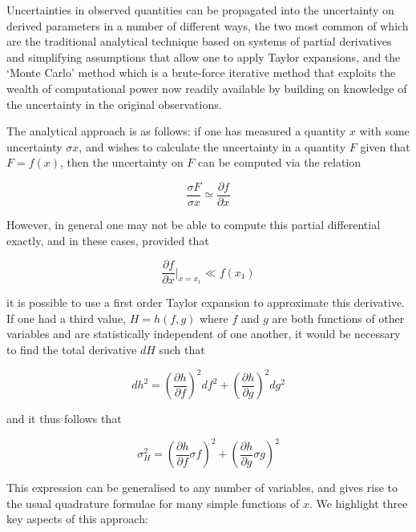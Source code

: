 \documentclass[useAMS,usenatbib]{mn2e}
\begin{document}
Uncertainties in observed quantities can be propagated into the uncertainty on derived parameters in a number of different ways, the two most common of which are the traditional analytical technique based on systems of partial derivatives and simplifying assumptions that allow one to apply Taylor expansions, and the `Monte Carlo' method which is a brute-force iterative method that exploits the wealth of computational power now readily available by building on knowledge of the uncertainty in the original observations.

The analytical approach is as follows: if one has measured a quantity $x$ with some uncertainty $\sigma x$, and wishes to calculate the uncertainty in a quantity $F$ given that $F = f(x)$, then the uncertainty on $F$ can be computed via the relation 

\begin{equation}
  \frac{\sigma F}{\sigma x} \simeq \frac{\partial f}{\partial x}
\end{equation}

However, in general one may not be able to compute this partial differential exactly, and in these cases, provided that

\begin{equation}
  \frac{\partial f}{\partial x}|_{x=x_1} \ll f(x_1)
\end{equation}

it is possible to use a first order Taylor expansion to approximate this derivative.  If one had a third value, $H = h(f, g)$ where $f$ and $g$ are both functions of other variables and are statistically independent of one another, it would be necessary to find the total derivative $dH$ such that

\begin{equation}
dh^2 = \left(\frac{\partial h}{\partial f}\right)^2df^2 + \left(\frac{\partial h}{\partial g}\right)^2dg^2
\end{equation}

and it thus follows that

\begin{equation}
\sigma^2_H = \left(\frac{\partial h}{\partial f}\sigma f\right)^2 + \left(\frac{\partial h}{\partial g}\sigma g\right)^2
\end{equation}

This expression can be generalised to any number of variables, and gives rise to the usual quadrature formulae for many simple functions of $x$.  We highlight three key aspects of this approach:
\end{document}
